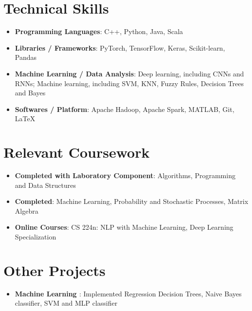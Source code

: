 \documentclass[a4,10pt]{article}
\newcommand{\resumeItem}[2]{
  \item\small{
    \textbf{#1}{: #2 \vspace{-2pt}}
  }
}
\newcommand{\resumeSubItem}[2]{\resumeItem{#1}{#2}\vspace{-4pt}}
\newcommand{\resumeSubHeadingListStart}{\begin{itemize}[leftmargin=*]}
\newcommand{\resumeSubHeadingListEnd}{\end{itemize}}
\begin{document}
 
\section{Technical Skills}
  \resumeSubHeadingListStart
    \resumeSubItem{Programming Languages}
      {C++, Python, Java, Scala}
    \resumeSubItem{Libraries / Frameworks}
      {PyTorch, TensorFlow, Keras, Scikit-learn, Pandas}
    \resumeSubItem{Machine Learning / Data Analysis}
      {Deep learning, including CNNs and RNNs; Machine learning, including SVM, KNN, Fuzzy Rules, Decision Trees and Bayes}
    \resumeSubItem{Softwares / Platform}
      {Apache Hadoop, Apache Spark, MATLAB, Git, \LaTeX}
  \resumeSubHeadingListEnd
  
 \section{Relevant Coursework}
  \resumeSubHeadingListStart
    \resumeSubItem{Completed with Laboratory Component}
      {Algorithms, Programming and Data Structures}
    \resumeSubItem{Completed}
      {Machine Learning, Probability and Stochastic Processes, Matrix Algebra}
    \resumeSubItem{Online Courses}
      {CS 224n: NLP with Machine Learning, Deep Learning Specialization}
  \resumeSubHeadingListEnd
  
\section{Other Projects}
  \resumeSubHeadingListStart
    \resumeSubItem{Machine Learning \href{https://github.com/utkarsh512/CS60050-Machine-Learning}{\faGithub} }
      {Implemented Regression Decision Trees, Naive Bayes classifier, SVM and MLP classifier}
  \resumeSubHeadingListEnd
\end{document}
